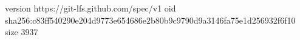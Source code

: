 version https://git-lfs.github.com/spec/v1
oid sha256:c83ff540290e204d9773e654686e2b80b9c9790d9a3146fa75e1d256932f6f10
size 3937
